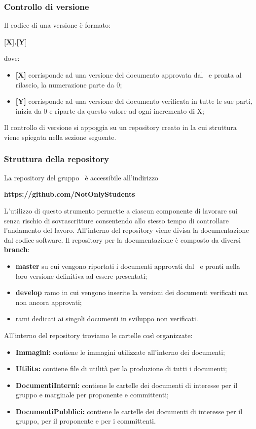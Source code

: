 \subsubsection{Controllo di versione}\label{Versionamento}
Il codice di una versione è formato: 
\begin{center}
	\textbf{[X].[Y]}
\end{center}
dove:
\begin{itemize}
	\item \textbf{[X]} corrisponde ad una versione del documento approvata dal \Responsabile\ e pronta al rilascio, la numerazione parte da 0;
	\item \textbf{[Y]} corrisponde ad una versione del documento verificata in tutte le sue parti, inizia da 0 e riparte da questo valore ad ogni incremento di X;
\end{itemize}
Il controllo di versione si appoggia su un repository creato in  la cui struttura viene spiegata nella sezione seguente.

\subsubsection{Struttura della repository}\label{StrutturaRepo}
La repository del gruppo \Gruppo\ è accessibile all'indirizzo
\begin{center}
	\textbf{https://github.com/NotOnlyStudents}
\end{center}
L'utilizzo di questo strumento permette a ciascun componente di lavorare sui  senza rischio di sovrascritture consentendo allo stesso tempo di controllare l'andamento del lavoro. 
All'interno del repository viene divisa la documentazione dal codice software.
\label{RepoDoc}Il repository per la documentazione è composto da diversi \textbf{branch}:
\begin{itemize}
	\item \textbf{master} su cui vengono riportati i documenti approvati dal \Responsabile\ e pronti nella loro versione definitiva ad essere presentati;
	\item \textbf{develop} ramo in cui vengono inserite la versioni dei documenti verificati ma non ancora approvati;
	\item rami dedicati ai singoli documenti in sviluppo non verificati.
\end{itemize}
All'interno del repository troviamo le cartelle così organizzate:
\begin{itemize}
	\item \textbf{Immagini:} contiene le immagini utilizzate all'interno dei documenti;
	\item \textbf{Utilita:} contiene file di utilità per la produzione di tutti i documenti;
	\item \textbf{DocumentiInterni:} contiene le cartelle dei documenti di interesse per il gruppo e marginale per proponente e committenti;
	\item \textbf{DocumentiPubblici:} contiene le cartelle dei documenti di interesse per il gruppo, per il proponente e per i committenti.
\end{itemize}

